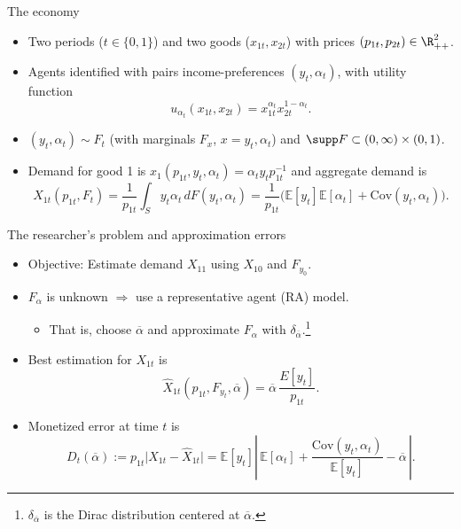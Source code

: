 \documentclass[10pt, handout]{beamer}
\begin{document}
\begin{frame}{The economy}
	\vfill
	\begin{itemize}
		\item Two periods ($t \in \{0,1\}$) and two goods ($x_{1t}, x_{2t}$) with prices $(p_{1t},p_{2t}) \in \R^{2}_{++}$. \vfill
		
		\item Agents identified with pairs income-preferences $(y_{t},\alpha_{t})$, with utility function\vspace{1ex}
				$$u_{\alpha_{t}}(x_{1t}, x_{2t}) = x_{1t}^{\alpha_{t}}x_{2t}^{1-\alpha_{t}}.$$\vfill
		
		\item $(y_{t},\alpha_{t}) \sim F_{t}$ (with marginals $F_{x}$, $x = y_{t},\alpha_{t}$) and $\supp F \subset (0,\infty) \times (0,1)$.\vfill
		
		\item Demand for good 1 is $x_{1}(p_{1t}, y_{t} ,\alpha_{t}) = \alpha_{t} y_{t} p_{1t}^{-1}$ and aggregate demand is\vspace{1ex}
				$$X_{1t}(p_{1t}, F_{t}) 
					= \frac{1}{p_{1t}} \int_{S} y_{t}\alpha_{t} \, dF(y_{t},\alpha_{t}) 
					= \frac{1}{p_{1t}}\Big(\mathbb{E}[y_{t}]\mathbb{E}[\alpha_{t}] + \mathrm{Cov}(y_{t},\alpha_{t})\Big).$$\vfill
	\end{itemize}
\end{frame}

\begin{frame}{The researcher's problem and approximation errors}
	\vfill
	\begin{itemize}
		\item Objective: Estimate demand $X_{11}$ using $X_{10}$ and $F_{y_{0}}$.\vfill
		
		\item $F_{\alpha}$ is unknown $\Rightarrow$ use a representative agent (RA) model.\vspace{1ex}
			\begin{itemize}
				\item That is, choose $\overline{\alpha}$ and approximate $F_{\alpha}$ with $\delta_{\overline{\alpha}}$.\footnote[frame]{$\delta_{\overline{\alpha}}$ is the Dirac distribution centered at $\overline{\alpha}$.}
			\end{itemize} \vfill
			
		\item Best estimation for $X_{1t}$ is\vspace{1ex}
				$$\widehat{X}_{1t}(p_{1t}, F_{y_{t}}, \overline{\alpha}) = \overline{\alpha}\, \frac{E[y_{t}]}{p_{1t}}.$$
			\vfill
				
		\item Monetized error at time $t$ is\vspace{1ex}
				$$D_{t}(\overline{\alpha}) 
		 			:=	p_{1t}\Big| X_{1t} - \widehat{X}_{1t}\Big|
					=	\mathbb{E}[y_{t}]\left|\, \mathbb{E}[\alpha_{t}] + \frac{\mathrm{Cov}(y_{t},\alpha_{t})}{\mathbb{E}[y_{t}]} - \overline{\alpha}\,\right|.$$
	\end{itemize} \vfill

\end{frame}
\end{document}
